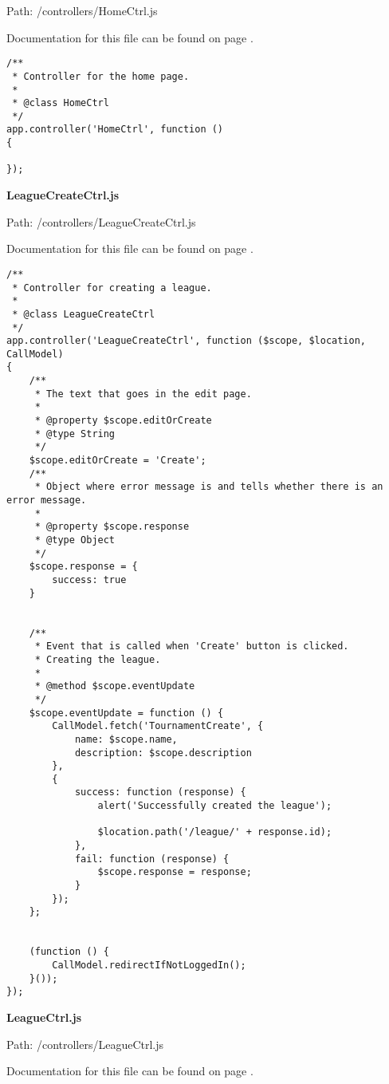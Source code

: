 Path: /controllers/HomeCtrl.js

Documentation for this file can be found on page \pageref{HomeCtrl.js.doc}.

{\scriptsize
\begin{lstlisting}
/**
 * Controller for the home page.
 *
 * @class HomeCtrl
 */
app.controller('HomeCtrl', function ()
{
	
});\end{lstlisting}
}
\textbf{LeagueCreateCtrl.js}\label{LeagueCreateCtrl.js}

Path: /controllers/LeagueCreateCtrl.js

Documentation for this file can be found on page \pageref{LeagueCreateCtrl.js.doc}.

{\scriptsize
\begin{lstlisting}
/**
 * Controller for creating a league.
 *
 * @class LeagueCreateCtrl
 */
app.controller('LeagueCreateCtrl', function ($scope, $location, CallModel)
{
	/**
	 * The text that goes in the edit page.
	 *
	 * @property $scope.editOrCreate
	 * @type String
	 */
	$scope.editOrCreate = 'Create';
	/**
	 * Object where error message is and tells whether there is an error message.
	 *
	 * @property $scope.response
	 * @type Object
	 */
	$scope.response = {
		success: true
	}
	
	
	/**
	 * Event that is called when 'Create' button is clicked.
	 * Creating the league.
	 *
	 * @method $scope.eventUpdate
	 */
	$scope.eventUpdate = function () {
		CallModel.fetch('TournamentCreate', {
			name: $scope.name,
			description: $scope.description
		},
		{
			success: function (response) {
				alert('Successfully created the league');

				$location.path('/league/' + response.id);
			},
			fail: function (response) {
				$scope.response = response;
			}
		});
	};


	(function () {
		CallModel.redirectIfNotLoggedIn();
	}());
});\end{lstlisting}
}
\textbf{LeagueCtrl.js}\label{LeagueCtrl.js}

Path: /controllers/LeagueCtrl.js

Documentation for this file can be found on page \pageref{LeagueCtrl.js.doc}.

